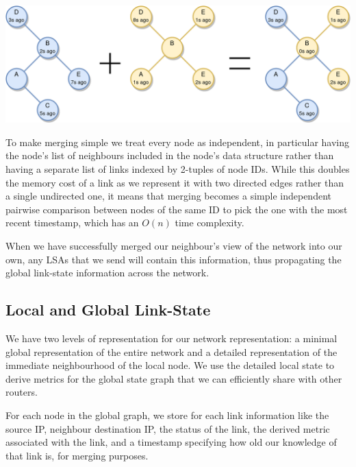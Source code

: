 \documentclass[withindex,glossary,openany]{cam-thesis}
\begin{document}
\begin{center}
\begin{minipage}{0.9\textwidth} \centering
	\includegraphics[width=1\textwidth]{lsa}
	\label{fig:lsa}
\end{minipage}
\end{center}

To make merging simple we treat every node as independent, in particular having the node's list of neighbours included in the node's data structure rather than having a separate list of links indexed by 2-tuples of node IDs. While this doubles the memory cost of a link as we represent it with two directed edges rather than a single undirected one, it means that merging becomes a simple independent pairwise comparison between nodes of the same ID to pick the one with the most recent timestamp, which has an $O(n)$ time complexity.

When we have successfully merged our neighbour's view of the network into our own, any LSAs that we send will contain this information, thus propagating the global link-state information across the network.

\subsection{Local and Global Link-State}

We have two levels of representation for our network representation: a minimal global representation of the entire network and a detailed representation of the immediate neighbourhood of the local node. We use the detailed local state to derive metrics for the global state graph that we can efficiently share with other routers.

For each node in the global graph, we store for each link information like the source IP, neighbour destination IP, the status of the link, the derived metric associated with the link, and a timestamp specifying how old our knowledge of that link is, for merging purposes.
\end{document}
